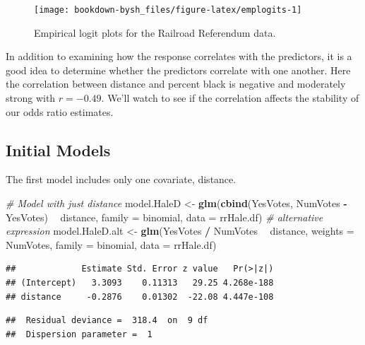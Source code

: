 \documentclass[
]{krantz}
\newenvironment{Shaded}{\begin{snugshade}}{\end{snugshade}}
\newcommand{\CommentTok}[1]{\textcolor[rgb]{0.37,0.37,0.37}{\textit{#1}}}
\newcommand{\DataTypeTok}[1]{\textcolor[rgb]{0.27,0.27,0.27}{#1}}
\newcommand{\KeywordTok}[1]{\textcolor[rgb]{0.27,0.27,0.27}{\textbf{#1}}}
\newcommand{\NormalTok}[1]{#1}
\newcommand{\OperatorTok}[1]{\textcolor[rgb]{0.43,0.43,0.43}{\textbf{#1}}}
\newcommand{\StringTok}[1]{\textcolor[rgb]{0.5,0.5,0.5}{#1}}
\begin{document}
\begin{figure}

{\centering \texttt{[image: bookdown-bysh\_files/figure-latex/emplogits-1]} 

}

\caption{Empirical logit plots for the Railroad Referendum data.}\label{fig:emplogits}
\end{figure}

In addition to examining how the response correlates with the predictors, it is a good idea to determine whether the predictors correlate with one another. Here the correlation between distance and percent black is negative and moderately strong with \(r = -0.49\). We'll watch to see if the correlation affects the stability of our odds ratio estimates.

\hypertarget{initial-models-1}{%
\subsection{Initial Models}\label{initial-models-1}}

The first model includes only one covariate, distance.

\begin{Shaded}
\begin{Highlighting}[]
\CommentTok{# Model with just distance}
\NormalTok{model.HaleD <-}\StringTok{ }\KeywordTok{glm}\NormalTok{(}\KeywordTok{cbind}\NormalTok{(YesVotes, NumVotes }\OperatorTok{-}\StringTok{ }\NormalTok{YesVotes) }\OperatorTok{~}
\StringTok{    }\NormalTok{distance, }\DataTypeTok{family =}\NormalTok{ binomial, }\DataTypeTok{data =}\NormalTok{ rrHale.df)}
\CommentTok{# alternative expression}
\NormalTok{model.HaleD.alt <-}\StringTok{ }\KeywordTok{glm}\NormalTok{(YesVotes }\OperatorTok{/}\StringTok{ }\NormalTok{NumVotes }\OperatorTok{~}\StringTok{ }\NormalTok{distance, }
    \DataTypeTok{weights =}\NormalTok{ NumVotes, }\DataTypeTok{family =}\NormalTok{ binomial, }\DataTypeTok{data =}\NormalTok{ rrHale.df)}
\end{Highlighting}
\end{Shaded}

\begin{verbatim}
##             Estimate Std. Error z value   Pr(>|z|)
## (Intercept)   3.3093    0.11313   29.25 4.268e-188
## distance     -0.2876    0.01302  -22.08 4.447e-108
\end{verbatim}

\begin{verbatim}
##  Residual deviance =  318.4  on  9 df 
##  Dispersion parameter =  1
\end{verbatim}
\end{document}
